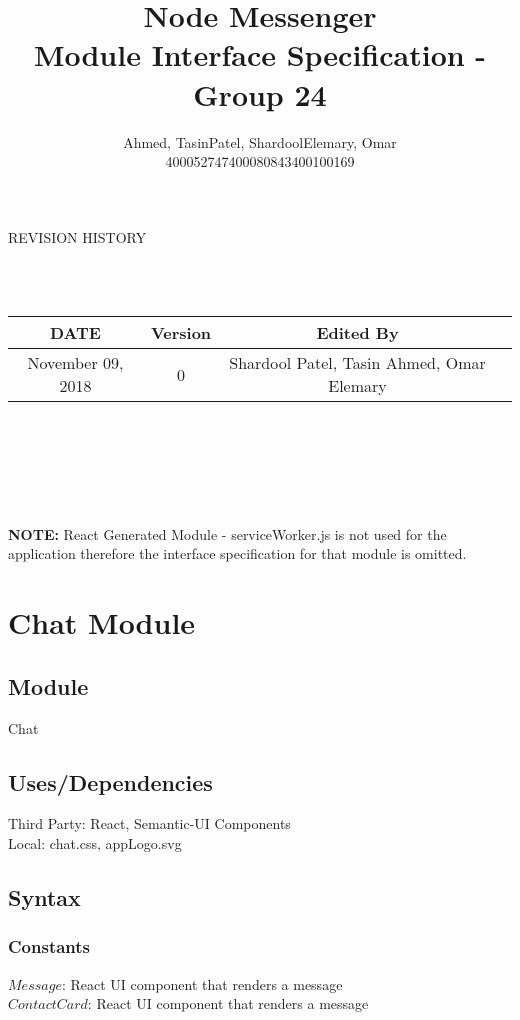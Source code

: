 \documentclass[12pt, titlepage]{article}
\title{\Huge\textbf{Node Messenger}\\
		\huge{Module Interface Specification - Group 24}}
\author{Ahmed, Tasin\hspace{1cm}Patel, Shardool\hspace{1cm}Elemary, Omar \\
		400052747\hspace{2cm}400080843\hspace{2cm}400100169}
\begin{document}
\maketitle
  	\begin{center}
    REVISION HISTORY
\end{center}\\\

\begin{table}[hp]
\begin{center}
\label{tab:}
\begin{tabular}{|c|c|c|c|}
\hline
\textbf{DATE} & \textbf{Version} & \textbf{Edited By}\\
\hline
November 09, 2018 & 0 & Shardool Patel, Tasin Ahmed, Omar Elemary\\
\hline
\end{tabular}\\\\
\end{center}
\label{default}
\end{table}
\\\\
\begin{center}
    \textbf{NOTE:} React Generated Module - serviceWorker.js is not used for the application therefore the interface specification for that module is omitted.
\end{center}


\newpage

\section* {Chat Module}

\subsection*{Module}

Chat

\subsection* {Uses/Dependencies}
Third Party: React, Semantic-UI Components\\
Local: chat.css, appLogo.svg

\subsection* {Syntax}

\subsubsection* {Constants} 
$Message$: React UI component that renders a message\\
$Contact Card$: React UI component that renders a message
\end{document}
